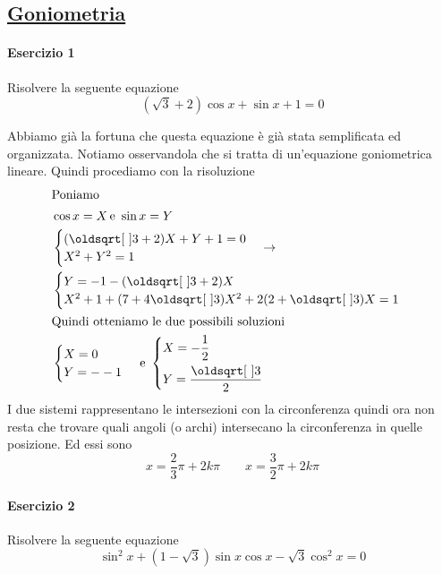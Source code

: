 \subsection*{\hyperref[sec:goniometria]{Goniometria}}\label{ex:goniometria}
\paragraph{Esercizio 1}
Risolvere la seguente equazione
\begin{equation*}
  (\sqrt{3}+2)\cos x + \sin x + 1 =0
\end{equation*}
\divisor

Abbiamo già la fortuna che questa equazione è già stata semplificata ed organizzata. Notiamo 
osservandola che si tratta di un'equazione goniometrica lineare. Quindi procediamo con la risoluzione
\begin{align*}
  \intertext{Poniamo}
  &\cos x = X\,\text{e } \sin x = Y\\
  &\begin{cases}
  (\sqrt{3}+2)X + Y + 1 = 0\\
  X^2+Y^2 = 1
\end{cases} \rightarrow\\
&\begin{cases}
Y = -1-(\sqrt{3}+2)X\\
X^2+1+(7+4\sqrt{3})X^2+2(2+\sqrt{3})X = 1
\end{cases}\\
\intertext{Quindi otteniamo le due possibili soluzioni}
&\begin{cases}
X = 0\\ Y=--1
\end{cases}\,\text{e }
\begin{dcases}
  X = -\frac{1}{2}\\ Y = \frac{\sqrt{3}}{2}
\end{dcases}
\end{align*}
I due sistemi rappresentano le intersezioni con la circonferenza quindi ora non resta che trovare 
quali angoli (o archi) intersecano la circonferenza in quelle posizione. Ed essi sono
\begin{equation*}
  x = \frac{2}{3}\pi + 2k\pi \qquad x = \frac{3}{2}\pi + 2k\pi
\end{equation*}

\paragraph{Esercizio 2}
Risolvere la seguente equazione
\begin{equation*}
  \sin^2x + (1-\sqrt{3})\sin x\cos x-\sqrt{3}\cos^2 x = 0
\end{equation*}
\divisor

